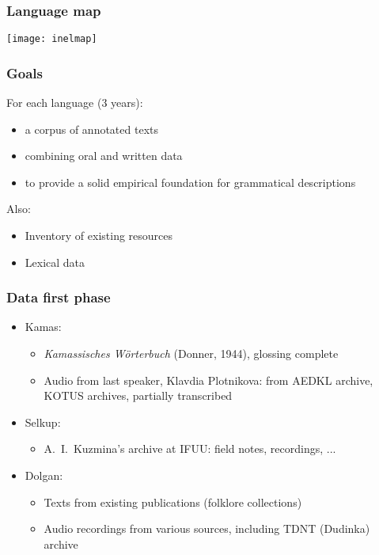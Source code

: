 \documentclass{beamer}
\begin{document}
\begin{frame}
    \frametitle{Language map}
    \texttt{[image: inelmap]}
\end{frame}

\begin{frame}
    \frametitle{Goals}
    For each language (3 years):
    \begin{itemize}
        \item a corpus of annotated texts
        \item combining oral and written data
        \item to provide a solid empirical
            foundation for grammatical descriptions
    \end{itemize}
    Also:
    \begin{itemize}
        \item Inventory of existing resources
        \item Lexical data
    \end{itemize}
\end{frame}

\begin{frame}
    \frametitle{Data first phase}
    \begin{itemize}
        \item Kamas:
        \begin{itemize}
            \item \emph{Kamassisches Wörterbuch} (Donner, 1944),
                glossing complete
            \item Audio from last speaker, Klavdia Plotnikova: from AEDKL
                archive, KOTUS archives, partially transcribed
        \end{itemize}
        \item Selkup:
        \begin{itemize}
           \item A.~I.~Kuzmina's archive at IFUU: field notes, recordings, ...
        \end{itemize}
    \item Dolgan: \begin{itemize}
            \item Texts from existing publications (folklore collections)
            \item Audio recordings from various sources, including TDNT (Dudinka)
                archive
    \end{itemize}
    \end{itemize}
\end{frame}
\end{document}
